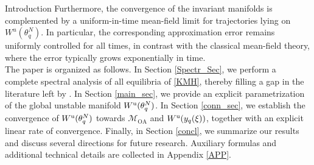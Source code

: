\documentclass{article}
\theoremstyle{definition}
\renewcommand{\u}{\textnormal{u}}
\newcommand{\OA}{\mathcal{M}_{\mathrm{OA}}}
\begin{document}
\begin{section}{Introduction}
Furthermore, the convergence of the invariant manifolds is complemented by a uniform-in-time mean-field limit for trajectories lying on $W^u(\theta_q^N)$. In particular, the corresponding approximation error remains uniformly controlled for all times, in contrast with the classical mean-field theory, where the error typically grows exponentially in time.\\

The paper is organized as follows. In Section \ref{Spectr_Sec}, we perform a complete spectral analysis of all equilibria of \eqref{KMH}, thereby filling a gap in the literature left by \cite{mirollo2005spectrum}. In Section \ref{main_sec}, we provide an explicit parametrization of the global unstable manifold $W^\u(\theta^N_q)$. In Section \ref{conn_sec}, we establish the convergence of $W^\u(\theta^N_q)$ towards $\OA$ and $W^\u(y_q(\xi))$, together with an explicit linear rate of convergence. Finally, in Section \ref{concl}, we summarize our results and discuss several directions for future research. Auxiliary formulas and additional technical details are collected in Appendix \ref{APP}.
\end{section}
\end{document}
